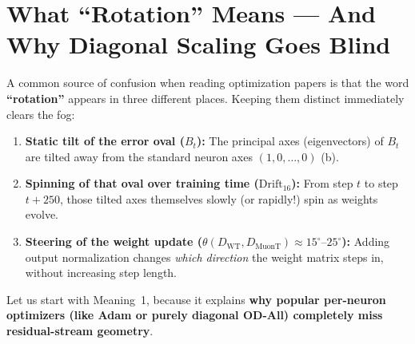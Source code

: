 \documentclass[11pt]{article}
\newcommand{\mname}[1]{#1}
\begin{document}
\section{What ``Rotation'' Means --- And Why Diagonal Scaling Goes Blind}
\label{sec:rotation_meaning}

A common source of confusion when reading optimization papers is that the word \textbf{``rotation''} appears in three different places. Keeping them distinct immediately clears the fog:
\begin{enumerate}[leftmargin=1.6em, itemsep=2pt, topsep=2pt]
  \item \textbf{Static tilt of the error oval ($B_t$):} The principal axes (eigenvectors) of $B_t$ are tilted away from the standard neuron axes $(1,0,\dots,0)$ (b).
  \item \textbf{Spinning of that oval over training time ($\mathrm{Drift}_{16}$):} From step $t$ to step $t+250$, those tilted axes themselves slowly (or rapidly!) spin as weights evolve.
  \item \textbf{Steering of the weight update ($\theta(D_{\mathrm{WT}}, D_{\mathrm{MuonT}}) \approx 15^\circ\text{--}25^\circ$):} Adding output normalization changes \emph{which direction} the weight matrix steps in, without increasing step length.
\end{enumerate}

Let us start with Meaning~1, because it explains \textbf{why popular per-neuron optimizers (like Adam or purely diagonal \mname{OD-All}) completely miss residual-stream geometry}.
\end{document}
